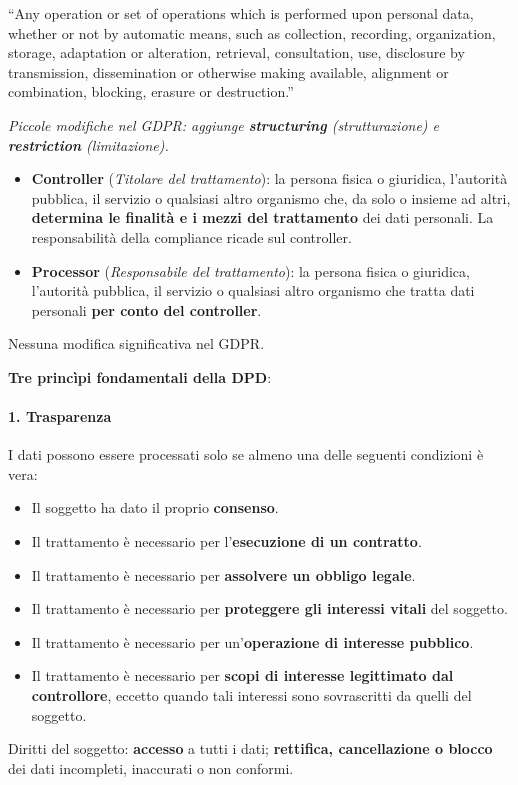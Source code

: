 \documentclass[a4paper,11pt]{article}
\begin{document}
\begin{definizione}
``Any operation or set of operations which is performed upon personal data, whether or not by automatic means, such as collection, recording, organization, storage, adaptation or alteration, retrieval, consultation, use, disclosure by transmission, dissemination or otherwise making available, alignment or combination, blocking, erasure or destruction.''

\emph{Piccole modifiche nel GDPR: aggiunge \textbf{structuring} (strutturazione) e \textbf{restriction} (limitazione).}
\end{definizione}

\begin{definizione}
\begin{itemize}
  \item \textbf{Controller} (\emph{Titolare del trattamento}): la persona fisica o giuridica, l'autorit\`{a} pubblica, il servizio o qualsiasi altro organismo che, da solo o insieme ad altri, \textbf{determina le finalit\`{a} e i mezzi del trattamento} dei dati personali. La responsabilit\`{a} della compliance ricade sul controller.
  \item \textbf{Processor} (\emph{Responsabile del trattamento}): la persona fisica o giuridica, l'autorit\`{a} pubblica, il servizio o qualsiasi altro organismo che tratta dati personali \textbf{per conto del controller}.
\end{itemize}
Nessuna modifica significativa nel GDPR.
\end{definizione}

\textbf{Tre princìpi fondamentali della DPD}:

\paragraph{1. Trasparenza}
I dati possono essere processati solo se almeno una delle seguenti condizioni \`{e} vera:
\begin{itemize}
  \item Il soggetto ha dato il proprio \textbf{consenso}.
  \item Il trattamento \`{e} necessario per l'\textbf{esecuzione di un contratto}.
  \item Il trattamento \`{e} necessario per \textbf{assolvere un obbligo legale}.
  \item Il trattamento \`{e} necessario per \textbf{proteggere gli interessi vitali} del soggetto.
  \item Il trattamento \`{e} necessario per un'\textbf{operazione di interesse pubblico}.
  \item Il trattamento \`{e} necessario per \textbf{scopi di interesse legittimato dal controllore}, eccetto quando tali interessi sono sovrascritti da quelli del soggetto.
\end{itemize}
Diritti del soggetto: \textbf{accesso} a tutti i dati; \textbf{rettifica, cancellazione o blocco} dei dati incompleti, inaccurati o non conformi.
\end{document}
